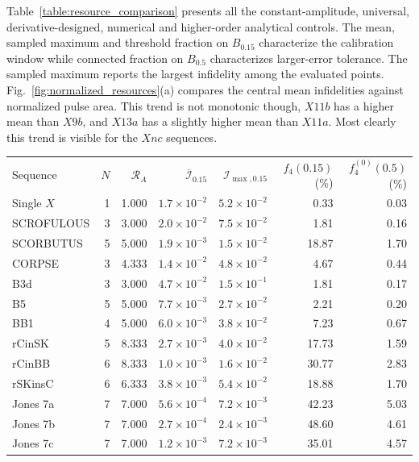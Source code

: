 \documentclass[10pt,aps,twocolumn,pra,floatfix,superscriptaddress]{revtex4-2}
\begin{document}
Table~\ref{table:resource_comparison} presents all the constant-amplitude, universal, derivative-designed, numerical and higher-order analytical controls. The mean, sampled maximum and threshold fraction on $B_{0.15}$ characterize the calibration window while connected fraction on $B_{0.5}$ characterizes larger-error tolerance. The sampled maximum reports the largest infidelity among the evaluated points. Fig.~\ref{fig:normalized_resources}(a) compares the central mean infidelities against normalized pulse area.
This trend is not monotonic though, $X11b$ has a higher mean than
$X9b$, and $X13a$ has a slightly higher mean than $X11a$. Most clearly this trend is visible for the $Xnc$ sequences.

\begin{table}[tp]
\centering\small
\setlength{\tabcolsep}{4pt}
\begin{ruledtabular}
\begin{tabular}{lrrrrrr}
Sequence & $N$ & $\mathcal R_A$ & $\overline{\mathcal I}_{0.15}$ & $\mathcal I_{\max,0.15}$ & $f_4(0.15)$ (\%) & $f_4^{(0)}(0.5)$ (\%) \\
Single $X$ & 1 & 1.000 & $1.7\times10^{-2}$ & $5.2\times10^{-2}$ & 0.33 & 0.03 \\
SCROFULOUS & 3 & 3.000 & $2.0\times10^{-2}$ & $7.5\times10^{-2}$ & 1.81 & 0.16 \\
SCORBUTUS & 5 & 5.000 & $1.9\times10^{-3}$ &
$1.5\times10^{-2}$ & 18.87 & 1.70 \\
CORPSE & 3 & 4.333 & $1.4\times10^{-2}$ & $4.8\times10^{-2}$ & 4.67 & 0.44 \\
B3d & 3 & 3.000 & $4.7\times10^{-2}$ & $1.5\times10^{-1}$ & 1.81 & 0.17 \\
B5 & 5 & 5.000 & $7.7\times10^{-3}$ & $2.7\times10^{-2}$ & 2.21 & 0.20 \\
BB1 & 4 & 5.000 & $6.0\times10^{-3}$ & $3.8\times10^{-2}$ & 7.23 & 0.67 \\
rCinSK & 5 & 8.333 & $2.7\times10^{-3}$ & $4.0\times10^{-2}$ & 17.73 & 1.59 \\
rCinBB & 6 & 8.333 & $1.0\times10^{-3}$ & $1.6\times10^{-2}$ & 30.77 & 2.83 \\
rSKinsC & 6 & 6.333 & $3.8\times10^{-3}$ & $5.4\times10^{-2}$ & 18.88 & 1.70 \\
Jones 7a & 7 & 7.000 & $5.6\times10^{-4}$ & $7.2\times10^{-3}$ & 42.23 & 5.03 \\
Jones 7b & 7 & 7.000 & $2.7\times10^{-4}$ & $2.4\times10^{-3}$ & 48.60 & 4.61 \\
Jones 7c & 7 & 7.000 & $1.2\times10^{-3}$ & $7.2\times10^{-3}$ & 35.01 & 4.57 \\

\end{tabular}
\end{ruledtabular}
\end{table}
\end{document}
